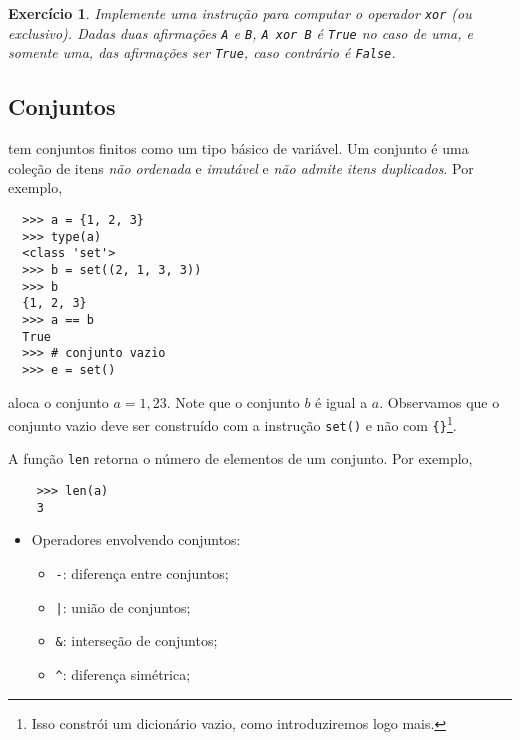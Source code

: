 \documentclass[12pt]{article}
\newtheorem{exr}{Exercício}[section]
\begin{document}
\begin{exr}
  Implemente uma instrução para computar o operador \verb+xor+ (ou exclusivo). Dadas duas afirmações \verb+A+ e \verb+B+, \verb+A xor B+ é \lstinline+True+ no caso de uma, e somente uma, das afirmações ser \lstinline+True+, caso contrário é \lstinline+False+.
\end{exr}


\subsection{Conjuntos}

{\python} tem conjuntos finitos como um tipo básico de variável. Um conjunto é uma coleção de itens \emph{não ordenada} e \emph{imutável} e \emph{não admite itens duplicados}. Por exemplo,
\begin{lstlisting}
  >>> a = {1, 2, 3}
  >>> type(a)
  <class 'set'>
  >>> b = set((2, 1, 3, 3))
  >>> b
  {1, 2, 3}
  >>> a == b
  True
  >>> # conjunto vazio
  >>> e = set()
\end{lstlisting}
aloca o conjunto $a = {1,2 3}$. Note que o conjunto $b$ é igual a $a$. Observamos que o conjunto vazio deve ser construído com a instrução \verb+set()+ e não com \verb+{}+\footnote{Isso constrói um dicionário vazio, como introduziremos logo mais.}.

\begin{obs}
  A função {\python} \verb+len+ retorna o número de elementos de um conjunto. Por exemplo,
  \begin{lstlisting}
    >>> len(a)
    3
  \end{lstlisting}
\end{obs}

\begin{itemize}
\item Operadores envolvendo conjuntos:
  \begin{itemize}
  \item[] \verb+-+: diferença entre conjuntos;
  \item[] \verb+|+: união de conjuntos;
  \item[] \verb+&+: interseção de conjuntos;
  \item[] \verb+^+: diferença simétrica;
  \end{itemize}
\end{itemize}
\end{document}
